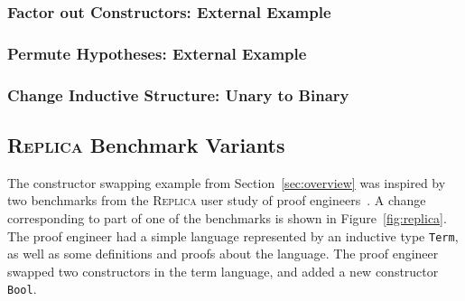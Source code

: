 \subsubsection*{Factor out Constructors: External Example}

\subsubsection*{Permute Hypotheses: External Example}

\subsubsection*{Change Inductive Structure: Unary to Binary}


\iffalse
\subsection{\textsc{Replica} Benchmark Variants}
\label{sec:replica}

\begin{figure*}
\begin{minipage}{0.48\textwidth}
   
\end{minipage}
\hfill
\begin{minipage}{0.48\textwidth}
   
\end{minipage}
\vspace{-0.4cm}
\caption{A simple language (left) and the same language with two swapped constructors and an added constructor (right).}
\label{fig:replica}
\end{figure*}

The constructor swapping example from Section~\ref{sec:overview} was inspired by two benchmarks 
from the \textsc{Replica} user study of proof engineers~\cite{replica}.
A change corresponding to part of one of the benchmarks is shown in Figure~\ref{fig:replica}.
The proof engineer had a simple language represented by an inductive type \lstinline{Term},
as well as some definitions and proofs about the language.
The proof engineer swapped two constructors in the term language,
and added a new constructor \lstinline{Bool}.

